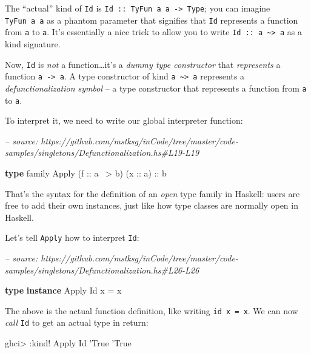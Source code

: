 \documentclass[]{article}
\newenvironment{Shaded}{}{}
\newcommand{\CommentTok}[1]{\textcolor[rgb]{0.38,0.63,0.69}{\textit{#1}}}
\newcommand{\DataTypeTok}[1]{\textcolor[rgb]{0.56,0.13,0.00}{#1}}
\newcommand{\FunctionTok}[1]{\textcolor[rgb]{0.02,0.16,0.49}{#1}}
\newcommand{\KeywordTok}[1]{\textcolor[rgb]{0.00,0.44,0.13}{\textbf{#1}}}
\newcommand{\NormalTok}[1]{#1}
\newcommand{\OtherTok}[1]{\textcolor[rgb]{0.00,0.44,0.13}{#1}}
\begin{document}
The ``actual'' kind of \texttt{Id} is
\texttt{Id\ ::\ TyFun\ a\ a\ -\textgreater{}\ Type}; you can imagine
\texttt{TyFun\ a\ a} as a phantom parameter that signifies that \texttt{Id}
represents a function from \texttt{a} to \texttt{a}. It's essentially a nice
trick to allow you to write
\texttt{Id\ ::\ a\ \textasciitilde{}\textgreater{}\ a} as a kind signature.

Now, \texttt{Id} is \emph{not} a function\ldots{}it's a \emph{dummy type
constructor} that \emph{represents} a function \texttt{a\ -\textgreater{}\ a}. A
type constructor of kind \texttt{a\ \textasciitilde{}\textgreater{}\ a}
represents a \emph{defunctionalization symbol} -- a type constructor that
represents a function from \texttt{a} to \texttt{a}.

To interpret it, we need to write our global interpreter function:

\begin{Shaded}
\begin{Highlighting}[]
\CommentTok{-- source: https://github.com/mstksg/inCode/tree/master/code-samples/singletons/Defunctionalization.hs#L19-L19}

\KeywordTok{type}\NormalTok{ family }\DataTypeTok{Apply}\NormalTok{ (}\OtherTok{f ::}\NormalTok{ a }\FunctionTok{~>}\NormalTok{ b) (}\OtherTok{x ::}\NormalTok{ a)}\OtherTok{ ::}\NormalTok{ b}
\end{Highlighting}
\end{Shaded}

That's the syntax for the definition of an \emph{open} type family in Haskell:
users are free to add their own instances, just like how type classes are
normally open in Haskell.

Let's tell \texttt{Apply} how to interpret \texttt{Id}:

\begin{Shaded}
\begin{Highlighting}[]
\CommentTok{-- source: https://github.com/mstksg/inCode/tree/master/code-samples/singletons/Defunctionalization.hs#L26-L26}

\KeywordTok{type} \KeywordTok{instance} \DataTypeTok{Apply} \DataTypeTok{Id}\NormalTok{ x }\FunctionTok{=}\NormalTok{ x}
\end{Highlighting}
\end{Shaded}

The above is the actual function definition, like writing \texttt{id\ x\ =\ x}.
We can now \emph{call} \texttt{Id} to get an actual type in return:

\begin{Shaded}
\begin{Highlighting}[]
\NormalTok{ghci}\FunctionTok{>} \FunctionTok{:}\NormalTok{kind}\FunctionTok{!} \DataTypeTok{Apply} \DataTypeTok{Id}\NormalTok{ '}\DataTypeTok{True}
\NormalTok{'}\DataTypeTok{True}
\end{Highlighting}
\end{Shaded}
\end{document}
